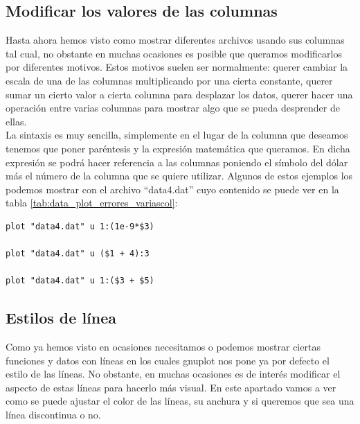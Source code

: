 \documentclass[11pt,a4paper,twoside,pdf]{article}
\numberwithin{equation}{section}
\begin{document}
\subsection{Modificar los valores de las columnas}

Hasta ahora hemos visto como mostrar diferentes archivos usando sus columnas tal cual, no obstante en muchas ocasiones es posible que queramos modificarlos por diferentes motivos. Estos motivos suelen ser normalmente: querer cambiar la escala de una de las columnas multiplicando por una cierta constante, querer sumar un cierto valor a cierta columna para desplazar los datos, querer hacer una operación entre varias columnas para mostrar algo que se pueda desprender de ellas. \\

La sintaxis es muy sencilla, simplemente en el lugar de la columna que deseamos tenemos que poner paréntesis y la expresión matemática que queramos. En dicha expresión se podrá hacer referencia a las columnas poniendo el símbolo del dólar más el número de la columna que se quiere utilizar. Algunos de estos ejemplos los podemos mostrar con el archivo ``data4.dat'' cuyo contenido se puede ver en la tabla \ref{tab:data_plot_errores_variascol}:

\begin{lstlisting}[language=Gnuplot]
plot "data4.dat" u 1:(1e-9*$3)

plot "data4.dat" u ($1 + 4):3

plot "data4.dat" u 1:($3 + $5)
\end{lstlisting}

\subsection{Estilos de línea\label{subsec:EstiloLinea}}


Como ya hemos visto en ocasiones necesitamos o podemos mostrar ciertas funciones y datos con líneas en los cuales gnuplot nos pone ya por defecto el estilo de las líneas. No obstante, en muchas ocasiones es de interés modificar el aspecto de estas líneas para hacerlo más visual. En este apartado vamos a ver como se puede ajustar el color de las líneas, su anchura y si queremos que sea una línea discontinua o no. \\
\end{document}
